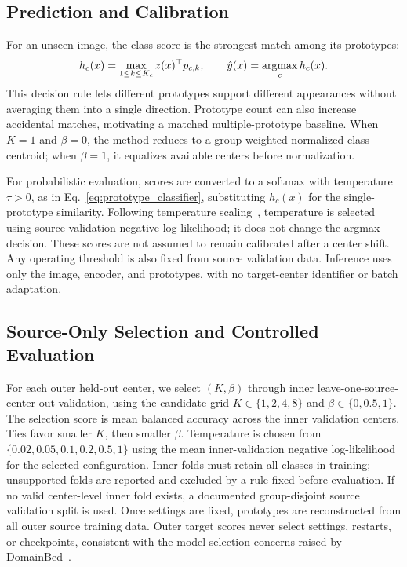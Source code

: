 \subsection{Prediction and Calibration}
For an unseen image, the class score is the strongest match among its prototypes:
\begin{equation}
    h_c(x)=\max_{1\leq k\leq K_c}z(x)^\top p_{c,k},
    \qquad \hat y(x)=\mathop{\rm argmax}_{c} h_c(x).
    \label{eq:cbmp_prediction}
\end{equation}
This decision rule lets different prototypes support different appearances without averaging them into a single direction. Prototype count can also increase accidental matches, motivating a matched multiple-prototype baseline. When $K=1$ and $\beta=0$, the method reduces to a group-weighted normalized class centroid; when $\beta=1$, it equalizes available centers before normalization.

For probabilistic evaluation, scores are converted to a softmax with temperature $\tau>0$, as in Eq.~\ref{eq:prototype_classifier}, substituting $h_c(x)$ for the single-prototype similarity. Following temperature scaling~\cite{guo2017calibration}, temperature is selected using source validation negative log-likelihood; it does not change the argmax decision. These scores are not assumed to remain calibrated after a center shift. Any operating threshold is also fixed from source validation data. Inference uses only the image, encoder, and prototypes, with no target-center identifier or batch adaptation.

\subsection{Source-Only Selection and Controlled Evaluation}
For each outer held-out center, we select $(K,\beta)$ through inner leave-one-source-center-out validation, using the candidate grid $K\in\{1,2,4,8\}$ and $\beta\in\{0,0.5,1\}$. The selection score is mean balanced accuracy across the inner validation centers. Ties favor smaller $K$, then smaller $\beta$. Temperature is chosen from $\{0.02,0.05,0.1,0.2,0.5,1\}$ using the mean inner-validation negative log-likelihood for the selected configuration. Inner folds must retain all classes in training; unsupported folds are reported and excluded by a rule fixed before evaluation. If no valid center-level inner fold exists, a documented group-disjoint source validation split is used. Once settings are fixed, prototypes are reconstructed from all outer source training data. Outer target scores never select settings, restarts, or checkpoints, consistent with the model-selection concerns raised by DomainBed~\cite{gulrajani2021domainbed}.

